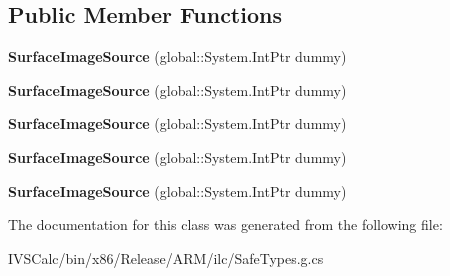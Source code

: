 \subsection*{Public Member Functions}
\begin{DoxyCompactItemize}
\item 
\mbox{\label{class_windows_1_1_u_i_1_1_xaml_1_1_media_1_1_imaging_1_1_surface_image_source_a69c19cdf38cfdcbd58ef76b8fad63dee}} 
{\bfseries Surface\+Image\+Source} (global\+::\+System.\+Int\+Ptr dummy)
\item 
\mbox{\label{class_windows_1_1_u_i_1_1_xaml_1_1_media_1_1_imaging_1_1_surface_image_source_a69c19cdf38cfdcbd58ef76b8fad63dee}} 
{\bfseries Surface\+Image\+Source} (global\+::\+System.\+Int\+Ptr dummy)
\item 
\mbox{\label{class_windows_1_1_u_i_1_1_xaml_1_1_media_1_1_imaging_1_1_surface_image_source_a69c19cdf38cfdcbd58ef76b8fad63dee}} 
{\bfseries Surface\+Image\+Source} (global\+::\+System.\+Int\+Ptr dummy)
\item 
\mbox{\label{class_windows_1_1_u_i_1_1_xaml_1_1_media_1_1_imaging_1_1_surface_image_source_a69c19cdf38cfdcbd58ef76b8fad63dee}} 
{\bfseries Surface\+Image\+Source} (global\+::\+System.\+Int\+Ptr dummy)
\item 
\mbox{\label{class_windows_1_1_u_i_1_1_xaml_1_1_media_1_1_imaging_1_1_surface_image_source_a69c19cdf38cfdcbd58ef76b8fad63dee}} 
{\bfseries Surface\+Image\+Source} (global\+::\+System.\+Int\+Ptr dummy)
\end{DoxyCompactItemize}


The documentation for this class was generated from the following file\+:\begin{DoxyCompactItemize}
\item 
I\+V\+S\+Calc/bin/x86/\+Release/\+A\+R\+M/ilc/Safe\+Types.\+g.\+cs\end{DoxyCompactItemize}
